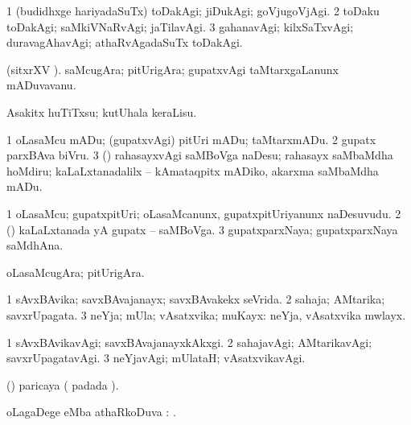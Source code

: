 \bentry
{}
\gl{\kirxvi}
\bmng
\bnum
\num{1} (budidhxge hariyadaSuTx) toDakAgi; jiDukAgi; goVjugoVjAgi. 
\num{2} toDaku toDakAgi; saMkiVNaRvAgi; jaTilavAgi. 
\num{3} gahanavAgi; kilxSaTxvAgi; duravagAhavAgi; athaRvAgadaSuTx toDakAgi. 
\enum
\emng
\eentry

\bentry
{}
\gl{\nA}
\bmng
(sitxrXV ). saMcugAra; pitUrigAra; gupatxvAgi taMtarxgaLanunx mADuvavanu. 
\emng
\eentry

\bentry
{}
\gl{\sakirx}
\bmng
Asakitx huTiTxsu; kutUhala keraLisu. 
\emng

\noindent
\gl{\akirx}
\bmng
\bnum
\num{1} oLasaMcu mADu; (gupatxvAgi) pitUri mADu; taMtarxmADu. 
\num{2} gupatx parxBAva biVru. 
\num{3} (\pArxparx) rahasayxvAgi saMBoVga naDesu; rahasayx saMbaMdha hoMdiru; kaLaLxtanadalilx -- kAmataqpitx mADiko, akarxma saMbaMdha mADu. 
\enum
\emng
\eentry

\bentry
{}
\gl{\nA}
\bmng
\bnum
\num{1} oLasaMcu; gupatxpitUri; oLasaMcanunx, gupatxpitUriyanunx naDesuvudu. 
\num{2} (\pArxparx) kaLaLxtanada yA gupatx -- saMBoVga. 
\num{3} gupatxparxNaya; gupatxparxNaya saMdhAna. 
\enum
\emng
\eentry

\bentry
{}
\gl{\nA}
\bmng
oLasaMcugAra; pitUrigAra. 
\emng
\eentry

\bentry
{}
\gl{\gu}
\bmng
\bnum
\num{1} sAvxBAvika; savxBAvajanayx; savxBAvakekx seVrida. 
\num{2} sahaja; AMtarika; savxrUpagata. 
\num{3} neYja; mUla; vAsatxvika; muKayx:  neYja, vAsatxvika mwlayx. 
\enum
\emng
\eentry

\bentry
{}
\gl{\kirxvi}
\bmng
\bnum
\num{1} sAvxBAvikavAgi; savxBAvajanayxkAkxgi. 
\num{2} sahajavAgi; AMtarikavAgi; savxrUpagatavAgi. 
\num{3} neYjavAgi; mUlataH; vAsatxvikavAgi. 
\enum
\emng
\eentry

\bentry
{}
\gl{\nA}
\bmng
(\AmA) paricaya ( padada \saMkiSx). 
\emng
\eentry

\bentry
{}
\gl{\sapUpa}
\bmng
oLagaDege eMba athaRkoDuva \sapUpa: . 
\emng
\eentry

